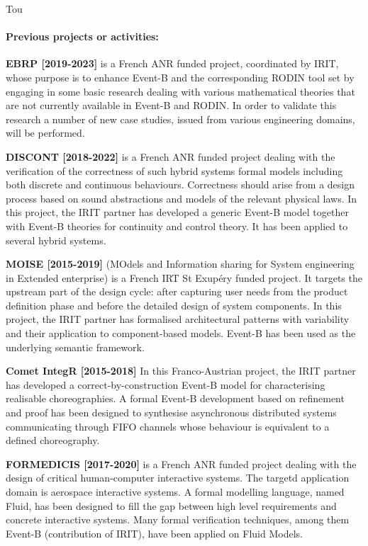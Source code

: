 \begin{sitedescription}{Tou}
\paragraph*{Previous projects or activities:}

\begin{compactitem}
 \item  \textbf{EBRP [2019-2023]} is a French ANR funded project, coordinated by IRIT,  whose purpose  is to enhance Event-B and the corresponding RODIN tool set by engaging in some basic research dealing with various mathematical theories that are not currently available in Event-B and RODIN. In order to validate this research a number of new case studies, issued from various engineering domains, will be performed. 
\item  \textbf{DISCONT [2018-2022]}  is a French ANR funded project dealing  with the verification of the correctness of such hybrid systems formal models including both discrete and continuous behaviours.  Correctness should arise from a design process based on sound abstractions and models of the relevant physical laws. In this project, the IRIT partner has developed a generic Event-B model together with Event-B theories for continuity and control theory. It has been applied to several hybrid systems. 
\item \textbf{MOISE [2015-2019]} (MOdels and Information sharing for System engineering in Extended enterprise) is a French IRT St Exupéry funded project. It targets the upstream part of the design cycle: after capturing user needs from the product definition phase and before the detailed design of system components. In this project, the IRIT partner has
formalised architectural patterns with variability and their
application to component-based models. Event-B has been used as the underlying semantic framework.
\item \textbf{Comet IntegR [2015-2018]} In this Franco-Austrian project, the IRIT partner has developed a correct-by-construction Event-B model for characterising realisable choreographies. A formal Event-B development based on refinement and proof has been designed to synthesise asynchronous distributed systems communicating through FIFO channels whose behaviour is equivalent to a defined choreography. 
 \item  \textbf{FORMEDICIS [2017-2020]}  is a French ANR funded project dealing with the design of critical human-computer interactive systems. The targetd application domain is aerospace interactive systems. A formal modelling language, named Fluid, has been designed to fill the gap between high level requirements and concrete interactive systems. Many formal verification techniques, among them Event-B (contribution of IRIT), have been applied on Fluid Models. 

\end{compactitem}
\end{sitedescription}
